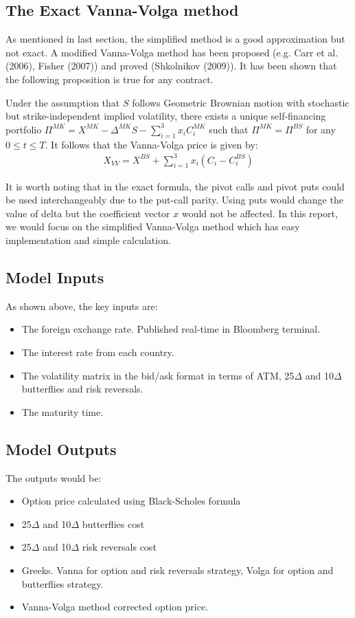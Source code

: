 \subsection{The Exact Vanna-Volga method}
As mentioned in last section, the simplified method is a good approximation but not exact. A modified Vanna-Volga method has been proposed (e.g. Carr et al. (2006), Fisher (2007)) and proved (Shkolnikov (2009)). It has been shown that the following proposition is true for any contract.
\begin{prop}
	Under the assumption that $S$ follows Geometric Brownian motion with stochastic but strike-independent implied volatility, there exists a unique self-financing portfolio $\Pi^{MK} = X^{MK}-\Delta^{MK} S-\sum_{i=1}^{3}x_i C_i^{MK}$ such that $\Pi^{MK} = \Pi^{BS}$ for any $0 \leq t \leq T$. It follows that the Vanna-Volga price is given by:
	\begin{align}
	X_{VV} = X^{BS}+\sum_{i=1}^{3}x_i\left( C_i - C_{i}^{BS}\right) 
	\end{align}
\end{prop}
It is worth noting that in the exact formula, the pivot calls and pivot puts could be used interchangeably due to the put-call parity. Using puts would change the value of delta but the coefficient vector $x$ would not be affected. \newline
In this report, we would focus on the simplified Vanna-Volga method which has easy implementation and simple calculation.

\subsection{Model Inputs}
As shown above, the key inputs are:
\begin{itemize}
	\item The foreign exchange rate. Published real-time in Bloomberg terminal.
	\item The interest rate from each country.
	\item The volatility matrix in the bid/ask format in terms of ATM, 25$\Delta$ and 10$\Delta$ butterflies and risk reversals.
	\item The maturity time.
\end{itemize}

\subsection{Model Outputs}
The outputs would be:
\begin{itemize}
	\item Option price calculated using Black-Scholes formula
	\item 25$\Delta$ and 10$\Delta$ butterflies cost
	\item 25$\Delta$ and 10$\Delta$ risk reversals cost
	\item Greeks. Vanna for option and risk reversals strategy, Volga for option and butterflies strategy.
	\item Vanna-Volga method corrected option price.
\end{itemize}